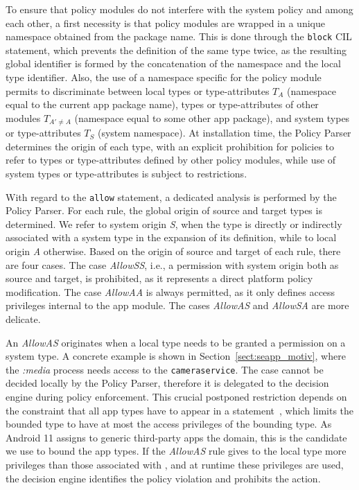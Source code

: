 To ensure that policy modules do not interfere with the system policy
and among each other, a first necessity is that policy modules are
wrapped in a unique namespace obtained from the package name.  This is
done through the {\tt block} CIL statement, which prevents the
definition of the same \sel type twice, as the resulting global
identifier is formed by the concatenation of the namespace and the
local type identifier.  Also, the use of a namespace specific for the
policy module permits to discriminate between local types or
type-attributes $T_A$ (namespace equal to the current app package
name), types or type-attributes of other modules $T_{A'\neq A}$
(namespace equal to some other app package), and system types or
type-attributes $T_S$ (system namespace).  At installation time, the
\pap Policy Parser determines the origin of each type, with an
explicit prohibition for policies to refer to types or type-attributes
defined by other policy modules, while use of system types or
type-attributes is subject to restrictions.


With regard to the {\tt allow} statement, a dedicated analysis is
performed by the \pap Policy Parser.  For each rule, the global origin
of source and target types is determined.  We refer to system origin
{\em S}, when the type is directly or indirectly associated with a
system type in the expansion of its definition, while to local origin
{\em A} otherwise.  Based on the origin of source and target of each
rule, there are four cases.  The case {\em AllowSS}, i.e., a
permission with system origin both as source and target, is
prohibited, as it represents a direct platform policy modification.
The case {\em AllowAA} is always permitted, as it only defines access
privileges internal to the app module.  The cases {\em AllowAS} and
{\em AllowSA} are more delicate.

An {\em AllowAS} originates when a local type needs to be granted a
permission on a system type.  A concrete example is shown in
Section~\ref{sect:seapp_motiv}, where the {\em :media} process needs
access to the {\tt camera\textunderscore service}.  The case cannot be
decided locally by the \pap Policy Parser, therefore it is delegated
to the \sel decision engine during policy enforcement.  This crucial
postponed restriction depends on the constraint that all app types
have to appear in a \typebounds statement~\cite{seapp_typebounds},
which limits the bounded type to have at most the access privileges of
the bounding type.  As Android 11 assigns to generic third-party apps
the \untrustedapp domain, this is the candidate we use to bound the
app types.  If the {\em AllowAS} rule gives to the local type more
privileges than those associated with \untrustedapp, and at runtime
these privileges are used, the \sel decision engine identifies the
policy violation and prohibits the action.

